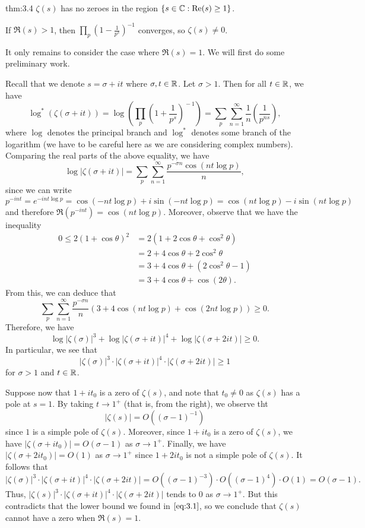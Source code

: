 \begin{theo}{thm:3.4}
$\zeta(s)$ has no zeroes in the region $\{s \in \mathbb{C} : 
{\rm Re}(s) \geq 1\}$. 
\end{theo}
\begin{pf}
If $\Re(s) > 1$, then $\prod_p (1 - \frac1{p^s})^{-1}$ 
converges, so $\zeta(s) \neq 0$. 

It only remains to consider the case where $\Re(s) = 1$. 
We will first do some preliminary work. 

Recall that we denote $s = \sigma + it$ where $\sigma, t \in \mathbb{R}$. Let $\sigma > 1$. Then for all $ t \in \mathbb{R}$, we have 
\[ \log^*(\zeta(\sigma + it)) = 
\log \left( \prod_p \left(1 + \frac1{p^s}\right)^{\!-1}\right) = \sum_p \sum_{n=1}^\infty \frac1n \left( \frac1{p^{ns}} \right), \]
where $\log$ denotes the principal branch and 
$\log^*$ denotes some branch of the logarithm (we have to be
careful here as we are considering complex numbers). Comparing
the real parts of the above equality, we have 
\[ \log|\zeta(\sigma+it)| = \sum_p \sum_{n=1}^\infty 
\frac{p^{-\sigma n} \cos(nt \log p)}{n}, \]
since we can write 
\[ p^{-int} = e^{-int \log p} = \cos(-nt \log p) + 
i \sin(-nt \log p) = \cos(nt \log p) - i\sin(nt \log p) \]
and therefore $\Re(p^{-int}) = \cos(nt \log p)$. 
Moreover, observe that we have the inequality 
\begin{align*}
    0 \leq 2(1+\cos\theta)^2 
    &= 2(1 + 2\cos\theta + \cos^2\theta) \\
    &= 2 + 4\cos\theta + 2\cos^2\theta \\
    &= 3 + 4\cos\theta + (2\cos^2\theta - 1) \\
    &= 3 + 4\cos\theta + \cos(2\theta). 
\end{align*}
From this, we can deduce that 
\[ \sum_p \sum_{n=1}^\infty \frac{p^{-\sigma n}}n 
(3 + 4\cos(nt \log p) + \cos(2nt \log p)) \geq 0. \]
Therefore, we have 
\[ \log|\zeta(\sigma)|^3 + \log|\zeta(\sigma+it)|^4 + 
\log|\zeta(\sigma+2it)| \geq 0. \]
In particular, we see that 
\begin{equation}
    |\zeta(\sigma)|^3 \cdot |\zeta(\sigma + it)|^4 
    \cdot |\zeta(\sigma+2it)| \geq 1 \label{eq:3.1}
\end{equation} 
for $\sigma > 1$ and $t \in \mathbb{R}$. 

Suppose now that $1 + it_0$ is a zero of $\zeta(s)$, 
and note that $t_0 \neq 0$ as $\zeta(s)$ has a pole at 
$s = 1$. By taking $t \to 1^+$ (that is, from the right), 
we observe tht 
\[ |\zeta(s)| = O((\sigma - 1)^{-1}) \]
since $1$ is a simple pole of $\zeta(s)$. Moreover, 
since $1 + it_0$ is a zero of $\zeta(s)$, we have 
$|\zeta(\sigma + it_0)| = O(\sigma-1)$ as 
$\sigma \to 1^+$. Finally, we have 
$|\zeta(\sigma + 2it_0)| = O(1)$ as $\sigma \to 1^+$ 
since $1 + 2it_0$ is not a simple pole of $\zeta(s)$. 
It follows that 
\[ |\zeta(\sigma)|^3 \cdot |\zeta(\sigma + it)|^4 
\cdot |\zeta(\sigma + 2it)| = 
O((\sigma - 1)^{-3}) \cdot O((\sigma - 1)^4) \cdot O(1) 
= O(\sigma - 1). \]
Thus, $|\zeta(s)|^3 \cdot |\zeta(\sigma+it)|^4 \cdot 
|\zeta(\sigma + 2it)|$ tends to $0$ as $\sigma \to 1^+$. 
But this contradicts that the lower bound we found in $\eqref{eq:3.1}$, 
so we conclude that $\zeta(s)$ cannot have a zero when 
$\Re(s) = 1$. 
\end{pf}

